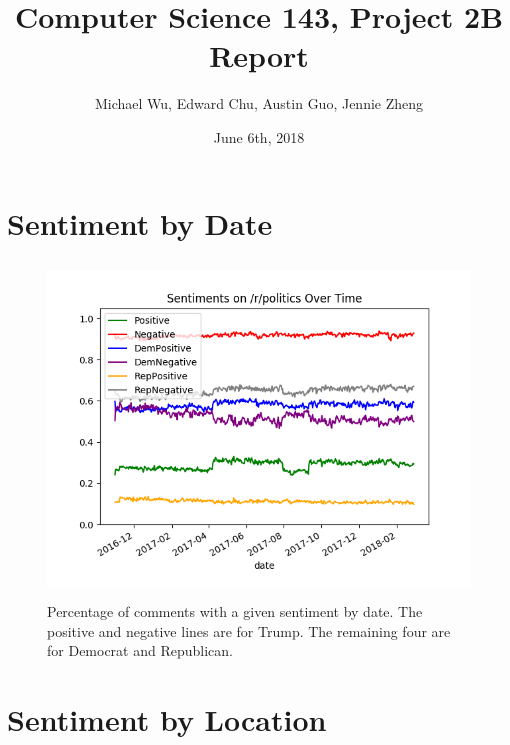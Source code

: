 \documentclass[12pt]{article}
\begin{document}
\title{Computer Science 143, Project 2B Report}
\date{June 6th, 2018}
\author{Michael Wu, Edward Chu, Austin Guo, Jennie Zheng}
\maketitle

\section{Sentiment by Date}

\begin{figure}[H]
        \begin{center}
                \includegraphics[height=3.5in]{plot1_sentiment_over_time.png}
                \caption{Percentage of comments with a given sentiment by date.
                The positive and negative lines are for Trump. The remaining four
                are for Democrat and Republican.}
        \end{center}
\end{figure}

\section{Sentiment by Location}
\end{document}
